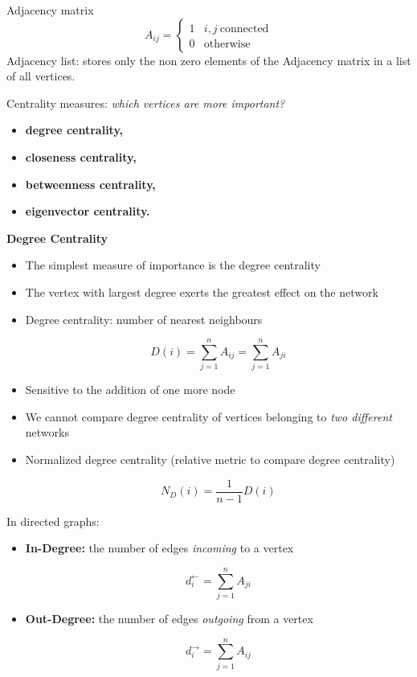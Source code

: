 Adjacency matrix
\begin{equation*}
    A_{ij} =
    \begin{cases}
        1 & i,j\ \text{connected} \\
        0 & \text{otherwise}      
    \end{cases}
\end{equation*}
Adjacency list: stores only the non zero elements of the Adjacency matrix in a list of all vertices.

Centrality measures: \textit{which vertices are more important?}
\begin{itemize}
    \item \textbf{degree centrality,}
    \item \textbf{closeness centrality,}
    \item \textbf{betweenness centrality,}
    \item \textbf{eigenvector centrality.}
\end{itemize}

\textbf{Degree Centrality}
\begin{itemize}
    \item The simplest measure of importance is the degree centrality
    \item The vertex with largest degree exerts the greatest effect on the network
    \item Degree centrality: number of nearest neighbours
          
          \begin{equation*}
              \boxed{D(i)=\sum _{j=1}^{n} A_{ij} =\sum _{j=1}^{n} A_{ji}}
          \end{equation*}
    \item Sensitive to the addition of one more node
    \item We cannot compare degree centrality of vertices belonging to \textit{two different} networks
    \item Normalized degree centrality (relative metric to compare degree centrality)
          
          \begin{equation*}
              \boxed{N_{D} (i)=\frac{1}{n-1} D(i)}
          \end{equation*}
\end{itemize}

In directed graphs:
\begin{itemize}
    \item \textbf{In-Degree:} the number of edges \textit{incoming} to a vertex
          
          \begin{equation*}
              d_{i}^{\leftarrow } =\sum _{j=1}^{n} A_{ji}
          \end{equation*}
    \item \textbf{Out-Degree:} the number of edges \textit{outgoing} from a vertex
          
          \begin{equation*}
              d_{i}^{\rightarrow } =\sum _{j=1}^{n} A_{ij}
          \end{equation*}
\end{itemize}

